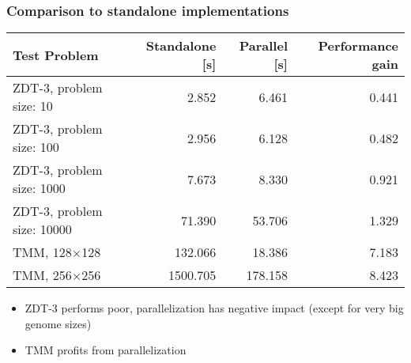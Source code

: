 \begin{frame}
  \frametitle{Comparison to standalone implementations}
  \scriptsize
  \begin{table}
    \centering
    \begin{tabular}{lrrr}\toprule[2pt]
      Test Problem &  Standalone [s] & Parallel [s] & Performance gain \\ \midrule
      ZDT-3, problem size: 10 & 2.852 & 6.461 & 0.441 \\
      ZDT-3, problem size: 100 & 2.956 & 6.128 & 0.482 \\
      ZDT-3, problem size: 1000 & 7.673 & 8.330 & 0.921 \\
      \rowcolor{Gray} ZDT-3, problem size: 10000 & 71.390 & 53.706 & 1.329 \\
      \rowcolor{Gray} TMM, 128$\times$128 & 132.066 & 18.386 & 7.183 \\
      \rowcolor{Gray} TMM, 256$\times$256 & 1500.705 & 178.158 & 8.423 \\ \bottomrule[2pt]
    \end{tabular}
    \label{table:sequential-runtimes}
  \end{table}
  \normalsize
  \begin{itemize}
    \item ZDT-3 performs poor, parallelization has negative impact (except for very big genome sizes)
    \item TMM profits from parallelization
  \end{itemize}
\end{frame}